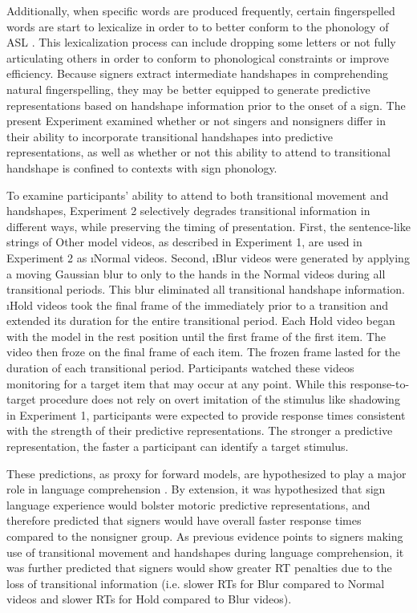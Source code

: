             Additionally, when specific words are produced frequently, certain fingerspelled words are start to lexicalize in order to to better conform to the phonology of ASL \cite{cormier2008, brentari1998}. This lexicalization process can include dropping some letters or not fully articulating others in order to conform to phonological constraints or improve efficiency. Because signers extract intermediate handshapes in comprehending natural fingerspelling, they may be better equipped to generate predictive representations based on handshape information prior to the onset of a sign. The present Experiment examined whether or not singers and nonsigners differ in their ability to incorporate transitional handshapes into predictive representations, as well as whether or not this ability to attend to transitional handshape is confined to contexts with sign phonology. \par
            To examine participants' ability to attend to both transitional movement and handshapes, Experiment 2 selectively degrades transitional information in different ways, while preserving the timing of presentation. First, the sentence-like strings of Other model videos, as described in Experiment 1, are used in Experiment 2 as \i{Normal} videos. Second, \i{Blur} videos were generated by applying a moving Gaussian blur to only to the hands in the Normal videos during all transitional periods. This blur eliminated all transitional handshape information. \i{Hold} videos took the final frame of the immediately prior to a transition and extended its duration for the entire transitional period. Each Hold video began with the model in the rest position until the first frame of the first item. The video then froze on the final frame of each item. The frozen frame lasted for the duration of each transitional period. Participants watched these videos monitoring for a target item that may occur at any point. While this response-to-target procedure does not rely on overt imitation of the stimulus like shadowing in Experiment 1, participants were expected to provide response times consistent with the strength of their predictive representations. The stronger a predictive representation, the faster a participant can identify a target stimulus. \par
            These predictions, as proxy for forward models, are hypothesized to play a major role in language comprehension \cite{PG}. By extension, it was hypothesized that sign language experience would bolster motoric predictive representations, and therefore predicted that signers would have overall faster response times compared to the nonsigner group. As previous evidence points to signers making use of transitional movement \cite{arendsen2007, hosemann2013} and handshapes \cite{brentari1998, cormier2008} during language comprehension, it was further predicted that signers would show greater RT penalties due to the loss of transitional information (i.e. slower RTs for Blur compared to Normal videos and slower RTs for Hold compared to Blur videos). 

